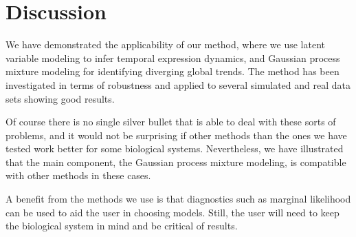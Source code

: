 \section{Discussion}

We have demonstrated the applicability of our  method, where we use latent variable modeling to infer temporal expression dynamics, and Gaussian process mixture modeling for identifying diverging global trends. The method has been investigated in terms of robustness and applied to several simulated and real data sets showing good results.

Of course there is no single silver bullet that is able to deal with these sorts of problems, and it would not be surprising if other methods than the ones we have tested work better for some biological systems. Nevertheless, we have illustrated that the main component, the Gaussian process mixture modeling, is compatible with other methods in these cases.

A benefit from the methods we use is that diagnostics such as marginal likelihood can be used to aid the user in choosing models. Still, the user will need to keep the biological system in mind and be critical of results.

